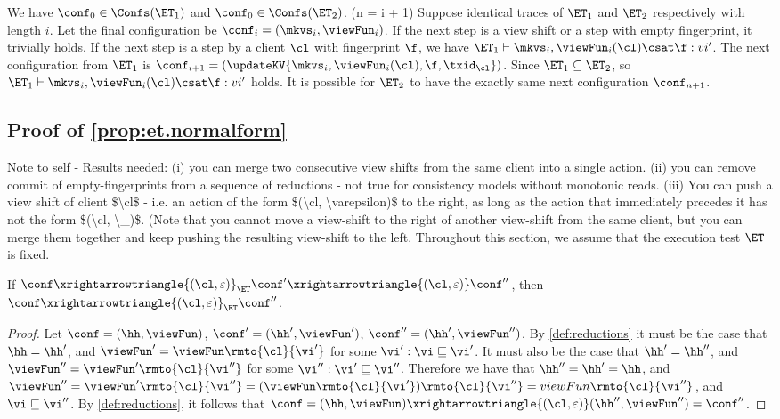 We have \( \conf_0 \in \Confs(\ET_1) \) and \( \conf_0 \in \Confs(\ET_2)\).
\caseI(n = i + 1)
Suppose identical traces of \( \ET_1 \) and \( \ET_2 \) respectively with length \( i \).
Let the final configuration be \( \conf_i = ( \mkvs_i, \viewFun_i ) \).
If the next step is a view shift or a step with empty fingerprint, it trivially holds.
If the next step is a step by a client \( \cl \) with fingerprint \( \f \),
we have \( \ET_1 \vdash \mkvs_i, \viewFun_i(\cl) \csat \f : vi' \).
The next configuration from \( \ET_1 \) is \( \conf_{i+1} = (\updateKV{ \mkvs_i, \viewFun_i(\cl), \f, \txid_\cl}) \).
Since \( \ET_1 \subseteq \ET_2 \), so \( \ET_1 \vdash \mkvs_i, \viewFun_i(\cl) \csat \f : vi' \) holds.
It is possible for \( \ET_2 \) to have the exactly same next configuration \( \conf_{n+1}\).

\subsection{Proof of \cref{prop:et.normalform}}
\label{sec:normal-form-exist}
\ac{Note to self - Results needed: (i) you can merge two consecutive view shifts from the same client into a single action. (ii) 
you can remove commit of empty-fingerprints from a sequence of reductions - not true for consistency models 
without monotonic reads. (iii) You can push a view 
shift of client $\cl$ - i.e. an action of the form $(\cl, \varepsilon)$ to the right, as long as the action that immediately precedes it has not the form 
$(\cl, \_)$. (Note that you cannot move a view-shift to the right of another view-shift from the same 
client, but you can merge them together and keep pushing the resulting view-shift to the left.}
Throughout this section, we assume that the execution test $\ET$ is fixed.

\begin{lemma}[Absorption]
\label{lem:et.absorb}
If $\conf \xrightarrowtriangle{(\cl, \varepsilon)}_{\ET} \conf' \xrightarrowtriangle{(\cl, \varepsilon)} \conf''$, then 
$\conf \xrightarrowtriangle{(\cl, \varepsilon)}_{\ET} \conf''$.
\end{lemma}

\begin{proof}
Let $\conf = (\hh, \viewFun)$, $\conf' = (\hh', \viewFun')$, $\conf'' = (\hh', \viewFun'')$. 
By \cref{def:reductions} it must be the case that $\hh = \hh'$, and $\viewFun' = \viewFun\rmto{\cl}{\vi'}$ 
for some $\vi' : \vi \sqsubseteq \vi'$. It must also be the case that $\hh' = \hh''$, and $\viewFun'' = \viewFun'\rmto{\cl}{\vi''}$ 
for some $\vi'': \vi' \sqsubseteq \vi''$. Therefore we have that $\hh'' = \hh' = \hh$, and 
$\viewFun'' = \viewFun'\rmto{\cl}{\vi''} = (\viewFun\rmto{\cl}{\vi'})\rmto{\cl}{\vi''} = viewFun\rmto{\cl}{\vi''}$, 
and $\vi \sqsubseteq \vi''$. By \cref{def:reductions}, it follows that 
$\conf = (\hh, \viewFun) \xrightarrowtriangle{(\cl, \varepsilon)} (\hh'', \viewFun'') = \conf''$.
\end{proof}

